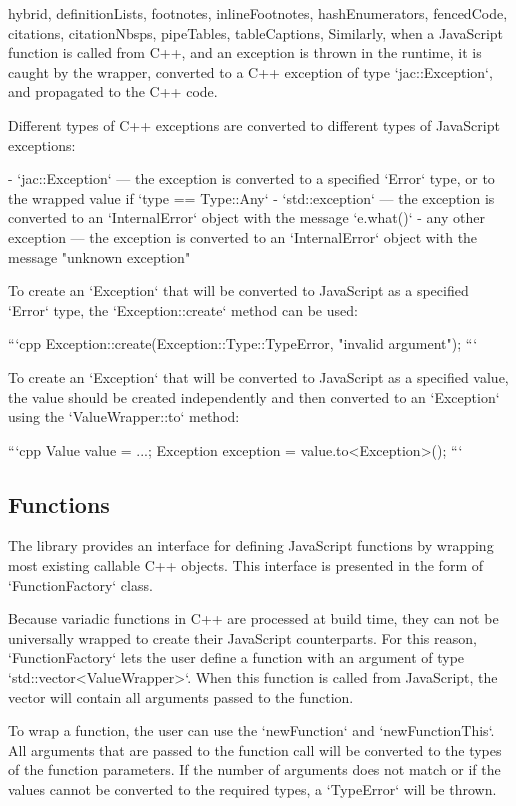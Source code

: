 \begin{markdown*}{%
  hybrid,
  definitionLists,
  footnotes,
  inlineFootnotes,
  hashEnumerators,
  fencedCode,
  citations,
  citationNbsps,
  pipeTables,
  tableCaptions,
}
Similarly, when a JavaScript function is called from C++, and an exception is thrown in the runtime, it is caught by the wrapper, converted to a C++ exception of type `jac::Exception`, and propagated to the C++ code.

Different types of C++ exceptions are converted to different types of JavaScript exceptions:

  - `jac::Exception` --- the exception is converted to a specified `Error` type, or to the wrapped value if `type == Type::Any`
  - `std::exception` --- the exception is converted to an `InternalError` object with the message `e.what()`
  - any other exception --- the exception is converted to an `InternalError` object with the message "unknown exception"

To create an `Exception` that will be converted to JavaScript as a specified `Error` type, the `Exception::create` method can be used:

```cpp
Exception::create(Exception::Type::TypeError, "invalid argument");
```

To create an `Exception` that will be converted to JavaScript as a specified value, the value should be created independently and then converted to an `Exception` using the `ValueWrapper::to` method:

```cpp
Value value = ...;
Exception exception = value.to<Exception>();
```

\subsection{Functions}

The library provides an interface for defining JavaScript functions by wrapping most existing callable C++ objects. This interface is presented in the form of `FunctionFactory` class.

Because variadic functions in C++ are processed at build time, they can not be universally wrapped to create their JavaScript counterparts. For this reason, `FunctionFactory` lets the user define a function with an argument of type `std::vector<ValueWrapper>`. When this function is called from JavaScript, the vector will contain all arguments passed to the function.

To wrap a function, the user can use the `newFunction` and `newFunctionThis`. All arguments that are passed to the function call will be converted to the types of the function parameters. If the number of arguments does not match or if the values cannot be converted to the required types, a `TypeError` will be thrown.


\end{markdown*}
